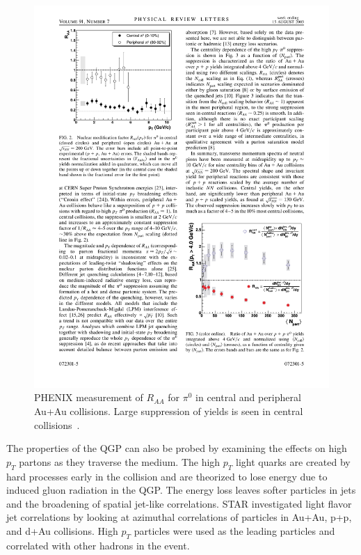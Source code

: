 \begin{figure}[htbp]
\begin{center}
\includegraphics[scale=1.2]{Plots/Intro/pi_RAA.pdf}
\end{center}
\caption[$R_{AA}$ for $\pi^0$]{PHENIX measurement of $R_{AA}$ for $\pi^0$ in central and peripheral Au+Au collisions. Large suppression of yields is seen in central collisions~\cite{PHENIXpiRAA}.}
\label{fig:piRAA}
\end{figure}

The properties of the QGP can also be probed by examining the effects on high $p_T$ partons as they traverse the medium. The high $p_T$ light quarks are created by hard processes early in the collision and are theorized to lose energy due to induced gluon radiation in the QGP. The energy loss leaves softer particles in jets and the broadening of spatial jet-like correlations. STAR investigated light flavor jet correlations by looking at azimuthal correlations of particles in Au+Au, p+p, and d+Au collisions. High $p_T$ particles were used as the leading particles and correlated with other hadrons in the event.

